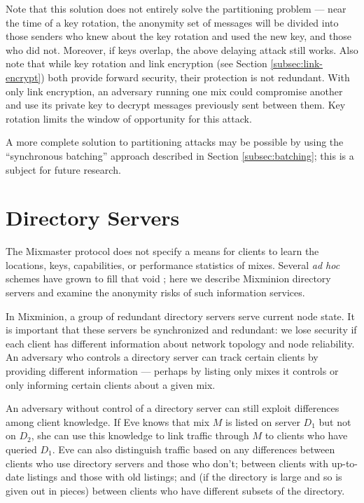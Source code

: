 \documentclass[11pt]{IEEEtran}
\begin{document}
Note that this solution does not entirely solve the partitioning problem
--- near the time of a key rotation, the anonymity set of messages will
be divided into those senders who knew about the key rotation and used
the new key, and those who did not.  Moreover, if keys overlap, the above
delaying attack still works.
Also note that while key rotation and link encryption (see Section
\ref{subsec:link-encrypt}) both provide forward security, their protection
is not redundant. With only link encryption, an adversary running
one mix could compromise another and use its private key to decrypt
messages previously sent between them. Key rotation limits the window
of opportunity for this attack.

A more complete solution to partitioning attacks may be possible by
using the ``synchronous batching'' approach described in
Section \ref{subsec:batching}; this is a subject for future research.


\section{Directory Servers}
\label{sec:dir-servers}

The Mixmaster protocol does not specify a means for clients to learn the
locations, keys, capabilities, or performance statistics of mixes. Several
\emph{ad hoc} schemes have grown to fill that void \cite{levien}; here
we describe Mixminion directory servers and examine the anonymity risks
of such information services.

In Mixminion, a group of redundant directory servers serve current
node state.  It is important that these servers be synchronized and
redundant:  we lose security if each client has different information
about network topology and node reliability. An adversary who controls
a directory server can track certain clients by providing different
information --- perhaps by listing only mixes it controls or only
informing certain clients about a given mix.

An adversary without control of a directory server can still exploit
differences among client knowledge. If Eve knows that mix $M$ is listed
on server $D_1$ but not on $D_2$, she can use this knowledge to link
traffic through $M$ to clients who have queried $D_1$.  Eve can also
distinguish traffic based on any differences between clients who use
directory servers and those who don't; between clients with up-to-date
listings and those with old listings; and (if the directory is large
and so is given out in pieces) between clients who have different subsets
of the directory.
\end{document}
